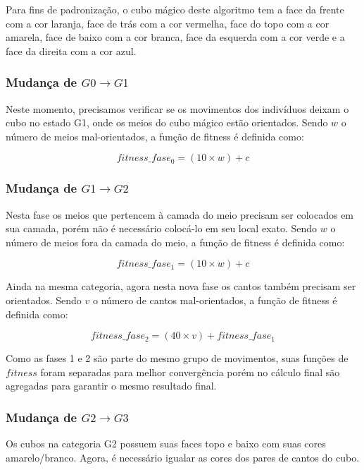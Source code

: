 \documentclass[12pt]{article}
\begin{document}
    Para fins de padronização, o cubo mágico deste algoritmo tem a face da frente com a cor laranja, face  de trás com a cor vermelha, face do topo com a cor amarela, face de baixo com a cor branca, face da esquerda com a cor verde e a face da direita com a cor azul.

    \subsubsection{Mudança de $G0 \to G1$}
      Neste momento, precisamos verificar se os movimentos dos indivíduos deixam o cubo no estado G1, onde os meios do cubo mágico estão orientados. Sendo $w$ o número de meios mal-orientados, a função de fitness é definida como:

      \begin{equation}
      fitness\_fase_0 = (10 \times w) + c
      \end{equation}

    \subsubsection{Mudança de $G1 \to G2$}
      Nesta fase os meios que pertencem à camada do meio precisam ser colocados em sua camada, porém não é necessário colocá-lo em seu local exato. Sendo $w$ o número de meios fora da camada do meio, a função de fitness é definida como:
      
      \begin{equation}
      fitness\_fase_1 = (10 \times w) + c
      \end{equation}

      Ainda na mesma categoria, agora nesta nova fase os cantos também precisam ser orientados. Sendo $v$ o número de cantos mal-orientados, a função de fitness é definida como:

      \begin{equation}
      fitness\_fase_2 = (40 \times v) + fitness\_fase_1
      \end{equation}

      Como as fases 1 e 2 são parte do mesmo grupo de movimentos, suas funções de $fitness$ foram separadas para melhor convergência porém no cálculo final são agregadas para garantir o mesmo resultado final.

    \subsubsection{Mudança de $G2 \to G3$}
      Os cubos na categoria G2 possuem suas faces topo e baixo com suas cores amarelo/branco. Agora, é necessário igualar as cores dos pares de cantos do cubo.
\end{document}
